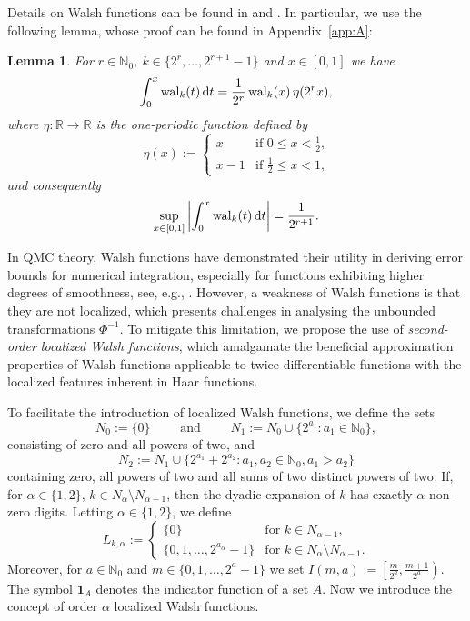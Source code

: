 \documentclass[namedate,webpdf,imanum]{ima-authoring-arxiv}%
\theoremstyle{thmstyletwo}%
\newtheorem{lemma}{Lemma}
\numberwithin{equation}{section}
\newcommand{\rd}{\, {\rm d}}
\newcommand{\wal}{{\rm wal}}
\newcommand{\NN}{\mathbb{N}}
\newcommand{\RR}{\mathbb{R}}
\begin{document}
Details on Walsh functions can be found in \cite{Fine} and \cite{SWS}. In particular, we use the following lemma, whose proof can be found in Appendix~\ref{app:A}:
\begin{lemma}\label{leWal}
For $r \in \NN_0$, $k \in \{2^r,\ldots,2^{r+1}-1\}$ and $x \in [0,1]$ we have
$$\int_0^x \wal_k(t) \rd t = \frac{1}{2^r}\, \wal_k(x) \, \eta (2^r x),$$ 
where $\eta:\RR \rightarrow \RR$ is the one-periodic function defined by $$\eta (x) := 
\left \{  
\begin{array}{ll} 
x & \mbox{if $0 \le x < \frac{1}{2}$,} \\
x-1 & \mbox{if $\frac{1}{2} \le x < 1$,}
\end{array}\right.$$
and consequently $$ \sup_{x \in [0,1]}\left|\int_0^x \wal_k(t) \rd t\right| = \frac{1}{2^{r+1}}.$$
\end{lemma}

In QMC theory, Walsh functions have demonstrated their utility in deriving error bounds for numerical integration, especially for functions exhibiting higher degrees of smoothness, see, e.g., \cite{DP10}. However, a weakness of Walsh functions is that they are not localized, which presents challenges in analysing the unbounded transformations $\Phi^{-1}$. To mitigate this limitation, we propose the use of \emph{second-order localized Walsh functions}, which amalgamate the beneficial approximation properties of Walsh functions applicable to twice-differentiable functions with the localized features inherent in Haar functions.



To facilitate the introduction of localized Walsh functions, we define the sets $$N_0:=\{0\} \qquad \mbox{ and }\qquad N_1:=N_0 \cup \{2^{a_1}  :  a_1 \in \NN_0\},$$ consisting of zero and all powers of two, and $$N_2:=N_1 \cup \{2^{a_1}+2^{a_2}:  a_1,a_2 \in \NN_0, a_1 >a_2\}$$ containing zero, all powers of two and all sums of two distinct powers of two. If, for $\alpha \in \{1,2\}$, $k \in N_{\alpha}\setminus N_{\alpha-1}$, then the dyadic expansion of $k$ has exactly $\alpha$ non-zero digits. Letting $\alpha \in \{1,2\}$, we define 
$$L_{k, \alpha} := \begin{cases} \{0\} & \mbox{for } k \in N_{\alpha-1},\\ \{0, 1, \ldots, 2^{a_{\alpha}} -1 \} & \mbox{for } k \in N_\alpha \setminus N_{\alpha-1}.\end{cases}$$ Moreover, for $a \in \NN_0$ and $m \in \{0,1,\ldots,2^a-1\}$ we set $I(m,a):=\left[\frac{m}{2^a},\frac{m+1}{2^a}\right)$. The symbol $\boldsymbol{1}_A$ denotes the indicator function of a set $A$. Now we introduce the concept of order $\alpha$ localized Walsh functions.
\end{document}
